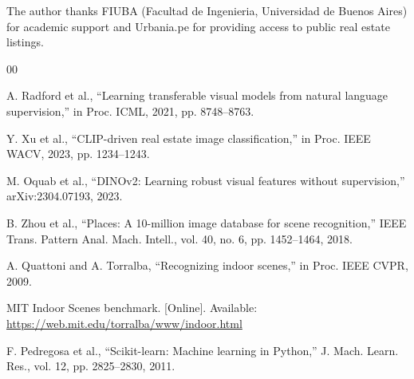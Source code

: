 \documentclass[conference]{IEEEtran}
\begin{document}
The author thanks FIUBA (Facultad de Ingenieria, Universidad de Buenos Aires) for academic support and Urbania.pe for providing access to public real estate listings.

\begin{thebibliography}{00}

 A. Radford et al., ``Learning transferable visual models from natural language supervision,'' in Proc. ICML, 2021, pp. 8748--8763.

 Y. Xu et al., ``CLIP-driven real estate image classification,'' in Proc. IEEE WACV, 2023, pp. 1234--1243.

 M. Oquab et al., ``DINOv2: Learning robust visual features without supervision,'' arXiv:2304.07193, 2023.

 B. Zhou et al., ``Places: A 10-million image database for scene recognition,'' IEEE Trans. Pattern Anal. Mach. Intell., vol. 40, no. 6, pp. 1452--1464, 2018.

 A. Quattoni and A. Torralba, ``Recognizing indoor scenes,'' in Proc. IEEE CVPR, 2009.

 MIT Indoor Scenes benchmark. [Online]. Available: \url{https://web.mit.edu/torralba/www/indoor.html}

 F. Pedregosa et al., ``Scikit-learn: Machine learning in Python,'' J. Mach. Learn. Res., vol. 12, pp. 2825--2830, 2011.

\end{thebibliography}
\end{document}
